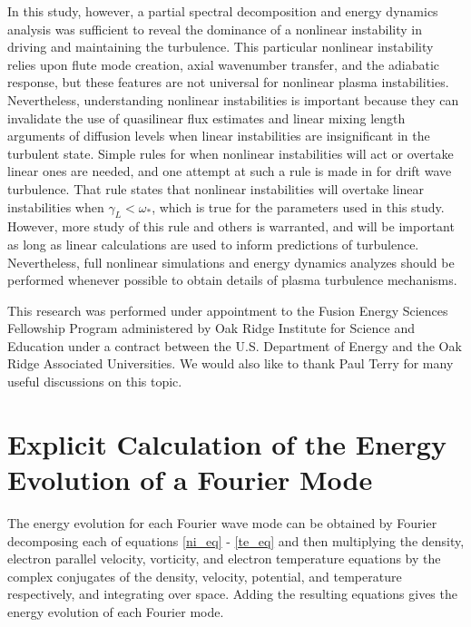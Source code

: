 \documentclass[showpacs,preprintnumbers,amsmath,amssymb,superscriptaddress]{revtex4}
\begin{document}
In this study, however, a partial spectral decomposition and energy dynamics analysis was sufficient to reveal the dominance of a nonlinear instability in driving and maintaining the turbulence. 
This particular nonlinear instability relies upon flute mode creation, axial wavenumber transfer, and the adiabatic response, but these features are not universal for nonlinear
plasma instabilities. Nevertheless,
understanding nonlinear instabilities is important because they can invalidate the use of quasilinear flux estimates and linear mixing length arguments of diffusion 
levels when linear instabilities are insignificant in the turbulent state. Simple rules for when nonlinear instabilities will act or overtake linear ones are needed, and one attempt at such
a rule is made in \cite{scott2005} for drift wave turbulence. That rule states that nonlinear instabilities will overtake linear instabilities when $\gamma_L < \omega_*$, which is true
for the parameters used in this study. However, more study of this rule and others is warranted, and will be important as long as linear calculations are used to inform predictions of turbulence.
Nevertheless, full nonlinear simulations and energy dynamics analyzes should be performed whenever possible to obtain details of plasma turbulence mechanisms.


\begin{acknowledgments}
This research was performed under appointment to the Fusion Energy Sciences Fellowship Program administered by Oak Ridge Institute for
Science and Education under a contract between the U.S. Department of Energy and the Oak Ridge Associated Universities. We would also like to thank Paul Terry for many
useful discussions on this topic.
\end{acknowledgments}



\appendix

\section{Explicit Calculation of the Energy Evolution of a Fourier Mode}

The energy evolution for each Fourier wave mode can be obtained by Fourier decomposing each of equations \ref{ni_eq} - \ref{te_eq}
and then multiplying the density, electron parallel velocity, vorticity, and electron temperature equations by the complex conjugates of the 
density, velocity, potential, and temperature respectively, and integrating over space.
Adding the resulting equations gives the energy evolution of each Fourier mode.
\end{document}
